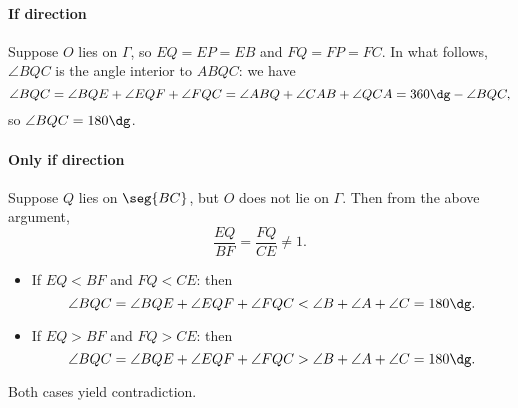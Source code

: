 \paragraph{If direction} Suppose $O$ lies on $\Gamma$, so $EQ=EP=EB$ and $FQ=FP=FC$. In what follows, $\angle BQC$ is the angle interior to $ABQC$: we have
\[\angle BQC=\angle BQE+\angle EQF+\angle FQC=\angle ABQ+\angle CAB+\angle QCA=360\dg-\angle BQC,\]
so $\angle BQC=180\dg$.

\paragraph{Only if direction} Suppose $Q$ lies on $\seg{BC}$, but $O$ does not lie on $\Gamma$. Then from the above argument,
\[\frac{EQ}{BF}=\frac{FQ}{CE}\ne1.\]
\begin{itemize}
\item If $EQ<BF$ and $FQ<CE$: then
    \[\angle BQC=\angle BQE+\angle EQF+\angle FQC<\angle B+\angle A+\angle C=180\dg.\]
\item If $EQ>BF$ and $FQ>CE$: then
    \[\angle BQC=\angle BQE+\angle EQF+\angle FQC>\angle B+\angle A+\angle C=180\dg.\]
\end{itemize}
Both cases yield contradiction.
